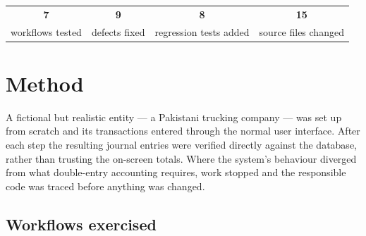 \documentclass[11pt,a4paper]{article}
\begin{document}
\vspace{6pt}
\noindent{}

\vspace{14pt}
\begin{center}
\begin{tabular}{@{}cccc@{}}
\toprule
\textbf{7} & \textbf{9} & \textbf{8} & \textbf{15}\\
\footnotesize\textsf{workflows tested} & \footnotesize\textsf{defects fixed} &
\footnotesize\textsf{regression tests added} & \footnotesize\textsf{source files changed}\\
\bottomrule
\end{tabular}
\end{center}

\section{Method}

A fictional but realistic entity --- a Pakistani trucking company --- was set up from scratch and
its transactions entered through the normal user interface. After each step the resulting journal
entries were verified directly against the database, rather than trusting the on-screen totals.
Where the system's behaviour diverged from what double-entry accounting requires, work stopped and
the responsible code was traced before anything was changed.

\subsection{Workflows exercised}
\end{document}
